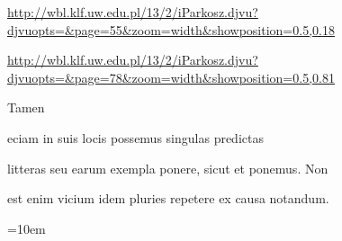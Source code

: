 
\newParkoszpage

{
\url{http://wbl.klf.uw.edu.pl/13/2/iParkosz.djvu?djvuopts=&page=55&zoom=width&showposition=0.5,0.18}

\url{http://wbl.klf.uw.edu.pl/13/2/iParkosz.djvu?djvuopts=&page=78&zoom=width&showposition=0.5,0.81}
}

\bigskip

\obeylines
\mono



\fullpreviouslines


{
\color{blue}

Tamen

eciam in suis locis possemus singulas predictas
}


\fulllines

litteras seu earum exempla ponere, sicut et ponemus. Non

est enim vicium idem pluries repetere ex causa notandum.



\def\splitverse{\advance\plineno by 1\psublineno=0\everypar{\advance\psublineno by 1\llap{\textcolor{green}{\the\ppageno-\ifnum\plineno<10 0\fi\the \plineno-\the\psublineno \ }}\hskip5em}}

\def\fullverselines{\everypar{\advance\plineno by 1\llap{\the\ppageno-\ifnum\plineno<10 0\fi\the \plineno \hskip 1.5em}\hskip5em}}


\def\newverse{\advance\plineno by 1\psublineno=0\hskip10em}
\def\newversesubline{\hskip\indentV}
\def\newverseline{\advance\plineno by 1\psublineno=0}
\newdimen\indentV
\indentV=10em
\def\indentVerse{\hskip\indentV{}}


